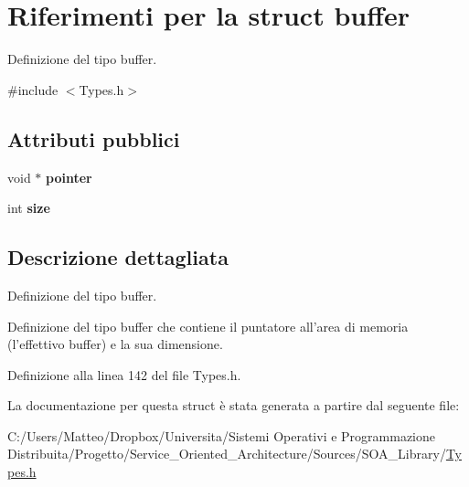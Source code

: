 \hypertarget{structbuffer}{\section{Riferimenti per la struct buffer}
\label{structbuffer}
}


Definizione del tipo buffer.  




{\ttfamily \#include $<$Types.\-h$>$}

\subsection*{Attributi pubblici}
\begin{DoxyCompactItemize}
\item 
\hypertarget{structbuffer_a38c20bf547bea96fef5b8eb2b935c587}{void $\ast$ {\bfseries pointer}}\label{structbuffer_a38c20bf547bea96fef5b8eb2b935c587}

\item 
\hypertarget{structbuffer_af3f397315f9d1257c0b271d6692c9e14}{int {\bfseries size}}\label{structbuffer_af3f397315f9d1257c0b271d6692c9e14}

\end{DoxyCompactItemize}


\subsection{Descrizione dettagliata}
Definizione del tipo buffer. 

Definizione del tipo buffer che contiene il puntatore all'area di memoria (l'effettivo buffer) e la sua dimensione. 

Definizione alla linea 142 del file Types.\-h.



La documentazione per questa struct è stata generata a partire dal seguente file\-:\begin{DoxyCompactItemize}
\item 
C\-:/\-Users/\-Matteo/\-Dropbox/\-Universita/\-Sistemi Operativi e Programmazione Distribuita/\-Progetto/\-Service\-\_\-\-Oriented\-\_\-\-Architecture/\-Sources/\-S\-O\-A\-\_\-\-Library/\hyperlink{_types_8h}{Types.\-h}\end{DoxyCompactItemize}
